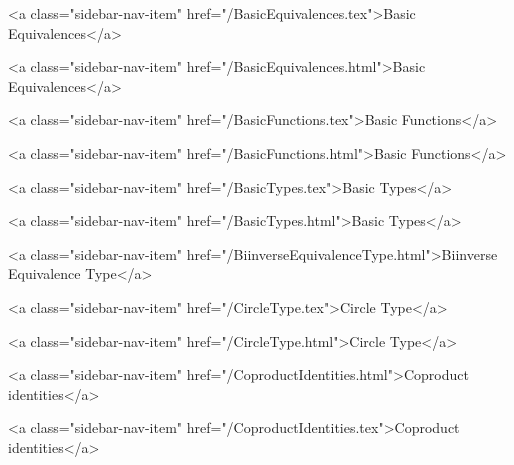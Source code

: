       
    
      
        
          <a class="sidebar-nav-item" href="/BasicEquivalences.tex">Basic Equivalences</a>
        
      
    
      
        
          <a class="sidebar-nav-item" href="/BasicEquivalences.html">Basic Equivalences</a>
        
      
    
      
        
          <a class="sidebar-nav-item" href="/BasicFunctions.tex">Basic Functions</a>
        
      
    
      
        
          <a class="sidebar-nav-item" href="/BasicFunctions.html">Basic Functions</a>
        
      
    
      
        
          <a class="sidebar-nav-item" href="/BasicTypes.tex">Basic Types</a>
        
      
    
      
        
          <a class="sidebar-nav-item" href="/BasicTypes.html">Basic Types</a>
        
      
    
      
        
          <a class="sidebar-nav-item" href="/BiinverseEquivalenceType.html">Biinverse Equivalence Type</a>
        
      
    
      
        
          <a class="sidebar-nav-item" href="/CircleType.tex">Circle Type</a>
        
      
    
      
        
          <a class="sidebar-nav-item" href="/CircleType.html">Circle Type</a>
        
      
    
      
        
          <a class="sidebar-nav-item" href="/CoproductIdentities.html">Coproduct identities</a>
        
      
    
      
        
          <a class="sidebar-nav-item" href="/CoproductIdentities.tex">Coproduct identities</a>
        
